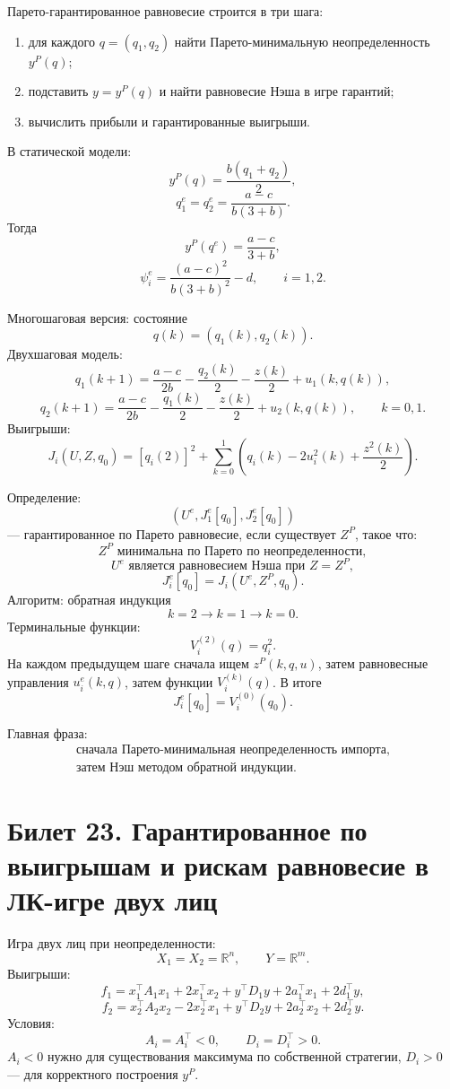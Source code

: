 \documentclass[12pt,a4paper]{article}
\newcommand{\R}{\mathbb{R}}
\begin{document}
Парето-гарантированное равновесие строится в три шага:
\begin{enumerate}
  \item для каждого $q=(q_1,q_2)$ найти Парето-минимальную неопределенность $y^P(q)$;
  \item подставить $y=y^P(q)$ и найти равновесие Нэша в игре гарантий;
  \item вычислить прибыли и гарантированные выигрыши.
\end{enumerate}

В статической модели:
\[
y^P(q)=\frac{b(q_1+q_2)}{2},
\]
\[
q_1^e=q_2^e=\frac{a-c}{b(3+b)}.
\]
Тогда
\[
y^P(q^e)=\frac{a-c}{3+b},
\]
\[
\psi_i^e=\frac{(a-c)^2}{b(3+b)^2}-d,
\qquad i=1,2.
\]

Многошаговая версия: состояние
\[
q(k)=(q_1(k),q_2(k)).
\]
Двухшаговая модель:
\[
q_1(k+1)=\frac{a-c}{2b}-\frac{q_2(k)}{2}-\frac{z(k)}{2}+u_1(k,q(k)),
\]
\[
q_2(k+1)=\frac{a-c}{2b}-\frac{q_1(k)}{2}-\frac{z(k)}{2}+u_2(k,q(k)),
\qquad k=0,1.
\]
Выигрыши:
\[
J_i(U,Z,q_0)=[q_i(2)]^2+\sum_{k=0}^{1}\left(q_i(k)-2u_i^2(k)+\frac{z^2(k)}{2}\right).
\]

Определение:
\[
(U^e,J_1^e[q_0],J_2^e[q_0])
\]
--- гарантированное по Парето равновесие, если существует $Z^P$, такое что:
\[
Z^P \text{ минимальна по Парето по неопределенности},
\]
\[
U^e \text{ является равновесием Нэша при } Z=Z^P,
\]
\[
J_i^e[q_0]=J_i(U^e,Z^P,q_0).
\]
Алгоритм: обратная индукция
\[
k=2\rightarrow k=1\rightarrow k=0.
\]
Терминальные функции:
\[
V_i^{(2)}(q)=q_i^2.
\]
На каждом предыдущем шаге сначала ищем $z^P(k,q,u)$, затем равновесные управления $u_i^e(k,q)$, затем функции $V_i^{(k)}(q)$. В итоге
\[
J_i^e[q_0]=V_i^{(0)}(q_0).
\]

Главная фраза:
\[
\begin{gathered}
\text{сначала Парето-минимальная неопределенность импорта,}\\
\text{затем Нэш методом обратной индукции.}
\end{gathered}
\]

\newpage
\section*{Билет 23. Гарантированное по выигрышам и рискам равновесие в ЛК-игре двух лиц}
Игра двух лиц при неопределенности:
\[
X_1=X_2=\R^n,
\qquad Y=\R^m.
\]
Выигрыши:
\[
f_1=x_1^\top A_1x_1+2x_1^\top x_2+y^\top D_1y+2a_1^\top x_1+2d_1^\top y,
\]
\[
f_2=x_2^\top A_2x_2-2x_2^\top x_1+y^\top D_2y+2a_2^\top x_2+2d_2^\top y.
\]
Условия:
\[
A_i=A_i^\top<0,
\qquad D_i=D_i^\top>0.
\]
$A_i<0$ нужно для существования максимума по собственной стратегии, $D_i>0$ --- для корректного построения $y^P$.
\end{document}
